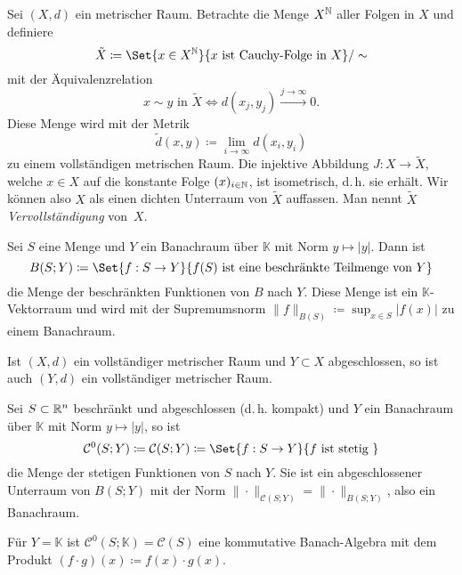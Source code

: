 \documentclass{cheat-sheet}
\newcommand{\K}{\mathbb{K}}
\newcommand{\convWith}[1]{\xrightarrow{#1 \to \infty}} %
\begin{document}
\begin{defn}[Vervollständigung]
  Sei $(X, d)$ ein metrischer Raum. Betrachte die Menge $X^{\mathbb{N}}$ aller Folgen in $X$ und definiere
  \[ \tilde{X} \coloneqq \Set{ x \in X^\N }{ x \text{ ist Cauchy-Folge in } X }/\sim \]
  mit der Äquivalenzrelation
  \[ x \sim y \text{ in } \tilde{X} \iff d(x_j, y_j) \convWith{j} 0. \]
  Diese Menge wird mit der Metrik
  \[ \tilde{d}(x, y) \coloneqq \lim_{i \to \infty} d(x_i, y_i) \]
  zu einem vollständigen metrischen Raum. Die injektive Abbildung $J : X \to \tilde{X}$, welche $x \in X$ auf die konstante Folge $(x)_{i \in \mathbb{N}}$, ist isometrisch, d.\,h. sie erhält. Wir können also $X$ als einen dichten Unterraum von $\tilde{X}$ auffassen. Man nennt $\tilde{X}$ \emph{Vervollständigung} von~$X$.
\end{defn}

\begin{defn}
  Sei $S$ eine Menge und $Y$ ein Banachraum über $\K$ mit Norm $y \mapsto |y|$. Dann ist
  \[ B(S; Y) \coloneqq \Set{ f : S \to Y }{ f(S) \text { ist eine beschränkte Teilmenge von } Y } \]
  die Menge der beschränkten Funktionen von $B$ nach $Y$. Diese Menge ist ein $\K$-Vektorraum und wird mit der Supremumsnorm $\| f \|_{B(S)} \coloneqq \sup_{x \in S} |f(x)|$ zu einem Banachraum.
\end{defn}

\begin{satz}
  Ist $(X, d)$ ein vollständiger metrischer Raum und $Y \subset X$ abgeschlossen, so ist auch $(Y, d)$ ein vollständiger metrischer Raum.
\end{satz}

\begin{defn}
  Sei $S \subset \mathbb{R}^n$ beschränkt und abgeschlossen (d.\,h. kompakt) und $Y$ ein Banachraum über $\K$ mit Norm $y \mapsto |y|$, so ist
  \[ \mathcal{C}^0(S; Y) \coloneqq \mathcal{C}(S; Y) \coloneqq \Set{ f : S \to Y }{ f \text{ ist stetig } } \]
  die Menge der stetigen Funktionen von $S$ nach $Y$. Sie ist ein abgeschlossener Unterraum von $B(S; Y)$ mit der Norm $\| \cdot \|_{\mathcal{C}(S; Y)} = \| \cdot \|_{B(S; Y)}$, also ein Banachraum.
\end{defn}

\begin{bem}
  Für $Y = \K$ ist $\mathcal{C}^0(S; \K) = \mathcal{C}(S)$ eine kommutative Banach-Algebra mit dem Produkt $(f \cdot g)(x) \coloneqq f(x) \cdot g(x)$.
\end{bem}
\end{document}
